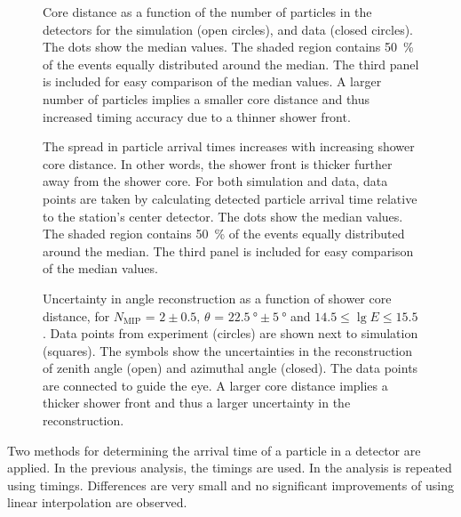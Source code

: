 \begin{figure}
\centering
{

}
\caption{Core distance as a function of the number of particles in the \hisparc
detectors for the simulation (open circles), and \kascade data (closed circles).
The dots show the median values. The shaded region contains \SI{50}{\percent} of the events
equally distributed around the median. The third panel is included for easy
comparison of the median values. A larger number of particles implies a
smaller core distance and thus increased timing accuracy due to a thinner shower front.}
\label{fig:results-core-mip}
\end{figure}

\begin{figure}
\centering
{

}
\caption{The spread in particle arrival times increases with increasing shower
core distance.  In other words, the shower front is thicker further away from
the shower core.  For both simulation and \kascade data, data points are taken
by calculating detected particle arrival time relative to the station's center
detector.  The dots show the median values. The shaded region contains
\SI{50}{\percent} of the events equally distributed around the median. The third
panel is included for easy comparison of the median values.}
\label{fig:results-core-arrival-time}
\end{figure}

\begin{figure}
\centering

\caption{Uncertainty in angle reconstruction as a function of shower core
distance, for $N_\mathrm{MIP}$ = $2 \pm 0.5$, $\theta$ = $\SI{22.5}{\degree}
\pm \SI{5}{\degree}$ and $14.5 \leq \lg E \leq 15.5$.  Data points from
experiment (circles) are shown next to simulation (squares). The symbols
show the uncertainties in the reconstruction of zenith angle (open) and
azimuthal angle (closed). The data points are connected to guide the eye.
A larger core distance implies a thicker shower front and thus a larger
uncertainty in the reconstruction.}
\label{fig:results-core-distance}
\end{figure}

Two methods for determining
the arrival time of a particle in a \hisparc detector are applied.
In the previous analysis, the  timings are used. In
 the analysis is repeated using 
timings. Differences are very small and no significant improvements of using
linear interpolation are observed.

